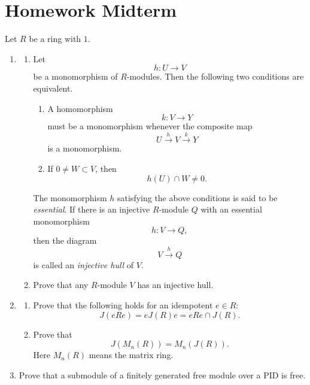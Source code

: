 \section{Homework Midterm}

\begin{exercise}
    Let \(R\) be a ring with \(1\).
    
    \begin{enumerate}
        \item
        \begin{enumerate}
            \item[(i)]
            Let
            \[
                h:U\longrightarrow V
            \]
            be a monomorphism of \(R\)-modules. Then the following two conditions are equivalent.
            \begin{enumerate}
                \item[(a)]
                A homomorphism
                \[
                    k:V\longrightarrow Y
                \]
                must be a monomorphism whenever the composite map
                \[
                    U \xrightarrow{\,h\,} V \xrightarrow{\,k\,} Y
                \]
                is a monomorphism.
    
                \item[(b)]
                If \(0\neq W\subset V\), then
                \[
                    h(U)\cap W\neq 0.
                \]
            \end{enumerate}
    
            The monomorphism \(h\) satisfying the above conditions is said to be
            \emph{essential}. If there is an injective \(R\)-module \(Q\) with an essential
            monomorphism
            \[
                h:V\longrightarrow Q,
            \]
            then the diagram
            \[
                V \xrightarrow{\,h\,} Q
            \]
            is called an \emph{injective hull} of \(V\).
    
            \item[(ii)]
            Prove that any \(R\)-module \(V\) has an injective hull.
        \end{enumerate}
    
        \item
        \begin{enumerate}
            \item[(i)]
            Prove that the following holds for an idempotent \(e\in R\):
            \[
                J(eRe)=eJ(R)e=eRe\cap J(R).
            \]
    
            \item[(ii)]
            Prove that
            \[
                J(M_n(R))=M_n(J(R)).
            \]
            Here \(M_n(R)\) means the matrix ring.
        \end{enumerate}
    
        \item
        Prove that a submodule of a finitely generated free module over a PID is free.
    \end{enumerate}
    \end{exercise}

